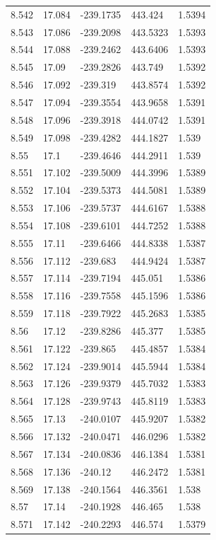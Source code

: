 \begin{tabular}{lllll}
8.542 & 17.084 & -239.1735 & 443.424 & 1.5394 \\
8.543 & 17.086 & -239.2098 & 443.5323 & 1.5393 \\
8.544 & 17.088 & -239.2462 & 443.6406 & 1.5393 \\
8.545 & 17.09 & -239.2826 & 443.749 & 1.5392 \\
8.546 & 17.092 & -239.319 & 443.8574 & 1.5392 \\
8.547 & 17.094 & -239.3554 & 443.9658 & 1.5391 \\
8.548 & 17.096 & -239.3918 & 444.0742 & 1.5391 \\
8.549 & 17.098 & -239.4282 & 444.1827 & 1.539 \\
8.55 & 17.1 & -239.4646 & 444.2911 & 1.539 \\
8.551 & 17.102 & -239.5009 & 444.3996 & 1.5389 \\
8.552 & 17.104 & -239.5373 & 444.5081 & 1.5389 \\
8.553 & 17.106 & -239.5737 & 444.6167 & 1.5388 \\
8.554 & 17.108 & -239.6101 & 444.7252 & 1.5388 \\
8.555 & 17.11 & -239.6466 & 444.8338 & 1.5387 \\
8.556 & 17.112 & -239.683 & 444.9424 & 1.5387 \\
8.557 & 17.114 & -239.7194 & 445.051 & 1.5386 \\
8.558 & 17.116 & -239.7558 & 445.1596 & 1.5386 \\
8.559 & 17.118 & -239.7922 & 445.2683 & 1.5385 \\
8.56 & 17.12 & -239.8286 & 445.377 & 1.5385 \\
8.561 & 17.122 & -239.865 & 445.4857 & 1.5384 \\
8.562 & 17.124 & -239.9014 & 445.5944 & 1.5384 \\
8.563 & 17.126 & -239.9379 & 445.7032 & 1.5383 \\
8.564 & 17.128 & -239.9743 & 445.8119 & 1.5383 \\
8.565 & 17.13 & -240.0107 & 445.9207 & 1.5382 \\
8.566 & 17.132 & -240.0471 & 446.0296 & 1.5382 \\
8.567 & 17.134 & -240.0836 & 446.1384 & 1.5381 \\
8.568 & 17.136 & -240.12 & 446.2472 & 1.5381 \\
8.569 & 17.138 & -240.1564 & 446.3561 & 1.538 \\
8.57 & 17.14 & -240.1928 & 446.465 & 1.538 \\
8.571 & 17.142 & -240.2293 & 446.574 & 1.5379 \\

\end{tabular}
